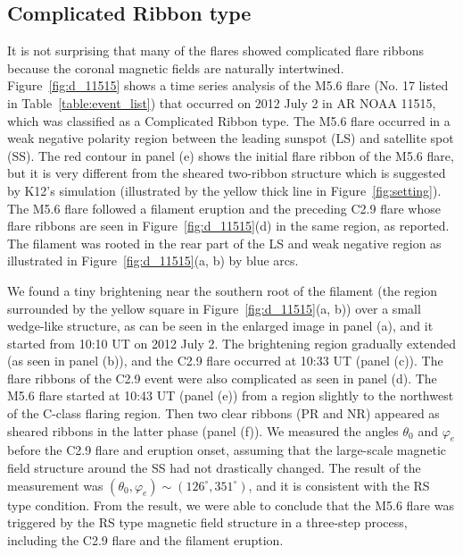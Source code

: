 \documentclass[10pt,preprint2]{aastex}
\begin{document}
\subsection{Complicated Ribbon type} \label{sec:dis_CR}

It is not surprising that many of the flares showed complicated flare ribbons because the coronal magnetic fields are naturally intertwined. 
Figure~\ref{fig:d_11515} shows a time series analysis of the M5.6 flare (No. 17 listed in Table~\ref{table:event_list}) that occurred on 2012 July 2 in AR NOAA 11515, which was classified as a Complicated Ribbon type.
The M5.6 flare occurred in a weak negative polarity region between the leading sunspot (LS) and satellite spot (SS).
The red contour in panel (e) shows the initial flare ribbon of the M5.6 flare, but it is very different from the sheared two-ribbon structure which is suggested by K12's simulation (illustrated by the yellow thick line in Figure~\ref{fig:setting}).
The M5.6 flare followed a filament eruption and the preceding C2.9 flare whose flare ribbons are seen in Figure~\ref{fig:d_11515}(d) in the same region, as \citet{louis14} reported.
The filament was rooted in the rear part of the LS and weak negative region as illustrated in Figure~\ref{fig:d_11515}(a, b) by blue arcs.

We found a tiny brightening near the southern root of the filament (the region surrounded by the yellow square in Figure~\ref{fig:d_11515}(a, b)) over a small wedge-like structure, as can be seen in the enlarged image in panel (a), and it started from 10:10 UT on 2012 July 2.
The brightening region gradually extended (as seen in panel (b)), and the C2.9 flare occurred at 10:33 UT (panel (c)).
The flare ribbons of the C2.9 event were also complicated as seen in panel (d).
The M5.6 flare started at 10:43 UT (panel (e)) from a region slightly to the northwest of the C-class flaring region.
Then two clear ribbons (PR and NR) appeared as sheared ribbons in the latter phase (panel (f)).
We measured the angles $\theta_{0}$ and $\varphi_{e}$ before the C2.9 flare and eruption onset, assuming that the large-scale magnetic field structure around the SS had not drastically changed.
The result of the measurement was $(\theta_{0}, \varphi_{e})\sim(126^{\circ}, 351^{\circ})$, and it is consistent with the RS type condition.
From the result, we were able to conclude that the M5.6 flare was triggered by the RS type magnetic field structure in a three-step process, including the C2.9 flare and the filament eruption.
\end{document}
